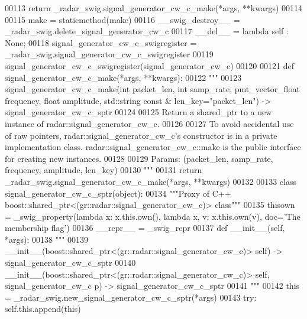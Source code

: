 \begin{DoxyCode}
{{{00113         \textcolor{keywordflow}{return} \_radar\_swig.signal\_generator\_cw\_c\_make(*args, **kwargs)
00114 
00115     make = staticmethod(make)
00116     \_\_swig\_destroy\_\_ = \_radar\_swig.delete\_signal\_generator\_cw\_c
00117     \_\_del\_\_ = \textcolor{keyword}{lambda} self : \textcolor{keywordtype}{None};
00118 signal\_generator\_cw\_c\_swigregister = \_radar\_swig.signal\_generator\_cw\_c\_swigregister
00119 signal_generator_cw_c_swigregister(signal\_generator\_cw\_c)
00120 
00121 \textcolor{keyword}{def }signal_generator_cw_c_make(*args, **kwargs):
00122   \textcolor{stringliteral}{"""}
00123 \textcolor{stringliteral}{    signal\_generator\_cw\_c\_make(int packet\_len, int samp\_rate, pmt\_vector\_float frequency, float amplitude,
       std::string const & len\_key="packet\_len") -> signal\_generator\_cw\_c\_sptr}
00124 \textcolor{stringliteral}{}
00125 \textcolor{stringliteral}{    Return a shared\_ptr to a new instance of radar::signal\_generator\_cw\_c.}
00126 \textcolor{stringliteral}{}
00127 \textcolor{stringliteral}{    To avoid accidental use of raw pointers, radar::signal\_generator\_cw\_c's constructor is in a private
       implementation class. radar::signal\_generator\_cw\_c::make is the public interface for creating new instances.}
00128 \textcolor{stringliteral}{}
00129 \textcolor{stringliteral}{    Params: (packet\_len, samp\_rate, frequency, amplitude, len\_key)}
00130 \textcolor{stringliteral}{    """}
00131   \textcolor{keywordflow}{return} \_radar\_swig.signal\_generator\_cw\_c\_make(*args, **kwargs)
00132 
00133 \textcolor{keyword}{class }signal_generator_cw_c_sptr(object):
00134     \textcolor{stringliteral}{"""Proxy of C++ boost::shared\_ptr<(gr::radar::signal\_generator\_cw\_c)> class"""}
00135     thisown = _swig_property(\textcolor{keyword}{lambda} x: x.this.own(), \textcolor{keyword}{lambda} x, v: x.this.own(v), doc=\textcolor{stringliteral}{'The membership flag'})
00136     \_\_repr\_\_ = \_swig\_repr
00137     \textcolor{keyword}{def }__init__(self, *args): 
00138         \textcolor{stringliteral}{"""}
00139 \textcolor{stringliteral}{        \_\_init\_\_(boost::shared\_ptr<(gr::radar::signal\_generator\_cw\_c)> self) -> signal\_generator\_cw\_c\_sptr}
00140 \textcolor{stringliteral}{        \_\_init\_\_(boost::shared\_ptr<(gr::radar::signal\_generator\_cw\_c)> self, signal\_generator\_cw\_c p) ->
       signal\_generator\_cw\_c\_sptr}
00141 \textcolor{stringliteral}{        """}
00142         this = \_radar\_swig.new\_signal\_generator\_cw\_c\_sptr(*args)
00143         \textcolor{keywordflow}{try}: self.this.append(this)
}}}
\end{DoxyCode}
